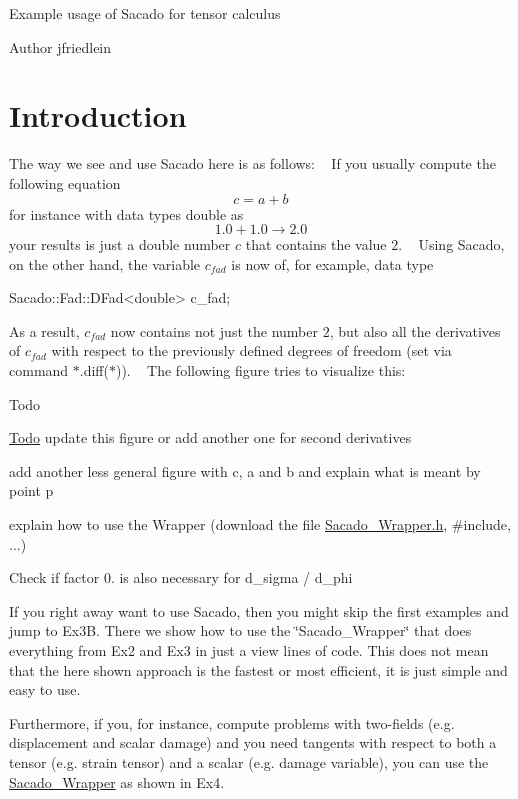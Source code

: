 Example usage of Sacado for tensor calculus\begin{DoxyAuthor}{Author}
jfriedlein
\end{DoxyAuthor}
\hypertarget{index_intro}{}\section{Introduction}\label{index_intro}
The way we see and use Sacado here is as follows\+: ~\newline
If you usually compute the following equation ~\newline
 \[ c = a + b \] for instance with data types double as ~\newline
 \[ 1.0 + 1.0 \rightarrow 2.0 \] your results is just a double number $ c $ that contains the value $ 2 $. ~\newline
 Using Sacado, on the other hand, the variable $ c_{fad} $ is now of, for example, data type 
\begin{DoxyCode}
Sacado::Fad::DFad<double> c\_fad;
\end{DoxyCode}
 As a result, $ c_{fad} $ now contains not just the number $ 2 $, but also all the derivatives of $ c_{fad} $ with respect to the previously defined degrees of freedom (set via command $\ast$.diff($\ast$)). ~\newline
The following figure tries to visualize this\+:  \begin{DoxyRefDesc}{Todo}
\item[\hyperlink{todo__todo000001}{Todo}]update this figure or add another one for second derivatives 

add another less general figure with c, a and b and explain what is meant by point p 

explain how to use the Wrapper (download the file \hyperlink{Sacado__Wrapper_8h}{Sacado\+\_\+\+Wrapper.\+h}, \#include, ...) 

Check if factor 0. is also necessary for d\+\_\+sigma / d\+\_\+phi\end{DoxyRefDesc}


If you right away want to use Sacado, then you might skip the first examples and jump to Ex3B. There we show how to use the \char`\"{}\+Sacado\+\_\+\+Wrapper\char`\"{} that does everything from Ex2 and Ex3 in just a view lines of code. This does not mean that the here shown approach is the fastest or most efficient, it is just simple and easy to use.

Furthermore, if you, for instance, compute problems with two-\/fields (e.\+g. displacement and scalar damage) and you need tangents with respect to both a tensor (e.\+g. strain tensor) and a scalar (e.\+g. damage variable), you can use the \hyperlink{namespaceSacado__Wrapper}{Sacado\+\_\+\+Wrapper} as shown in Ex4.

